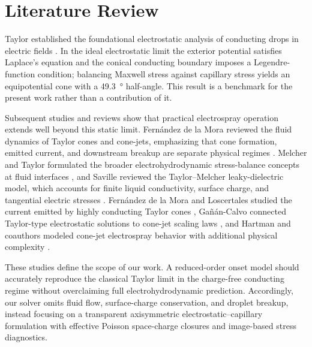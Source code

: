 \section{Literature Review}

Taylor established the foundational electrostatic analysis of conducting drops in electric fields \cite{taylor1964disintegration}. In the ideal electrostatic limit the exterior potential satisfies Laplace's equation and the conical conducting boundary imposes a Legendre-function condition; balancing Maxwell stress against capillary stress yields an equipotential cone with a \SI{49.3}{\degree} half-angle. This result is a benchmark for the present work rather than a contribution of it.

Subsequent studies and reviews show that practical electrospray operation extends well beyond this static limit. Fern\'andez de la Mora reviewed the fluid dynamics of Taylor cones and cone-jets, emphasizing that cone formation, emitted current, and downstream breakup are separate physical regimes \cite{fernandez2007fluid}. Melcher and Taylor formulated the broader electrohydrodynamic stress-balance concepts at fluid interfaces \cite{melcher1969electrohydrodynamics}, and Saville reviewed the Taylor--Melcher leaky-dielectric model, which accounts for finite liquid conductivity, surface charge, and tangential electric stresses \cite{saville1997electrohydrodynamics}. Fern\'andez de la Mora and Loscertales studied the current emitted by highly conducting Taylor cones \cite{fernandez1994current}, Gañán-Calvo connected Taylor-type electrostatic solutions to cone-jet scaling laws \cite{ganan1997conejet}, and Hartman and coauthors modeled cone-jet electrospray behavior with additional physical complexity \cite{hartman1999electrohydrodynamic}.

These studies define the scope of our work. A reduced-order onset model should accurately reproduce the classical Taylor limit in the charge-free conducting regime without overclaiming full electrohydrodynamic prediction. Accordingly, our solver omits fluid flow, surface-charge conservation, and droplet breakup, instead focusing on a transparent axisymmetric electrostatic--capillary formulation with effective Poisson space-charge closures and image-based stress diagnostics. 
